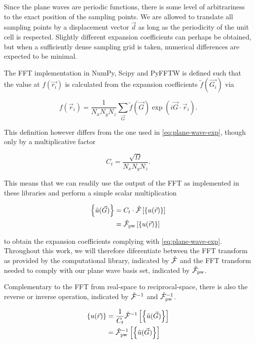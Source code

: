 Since the plane waves are periodic functions, there is some level of arbitrariness to the exact position of the sampling points. We are allowed to translate all sampling points by a displacement vector $\vec{d}$ as long as the periodicity of the unit cell is respected. Slightly different expansion coefficients can perhaps be obtained, but when a sufficiently dense sampling grid is taken, numerical differences are expected to be minimal.

The FFT implementation in NumPy, Scipy and PyFFTW is defined such that the value at $f(\vec{r_{i}})$ is calculated from the expansion coefficients $\tilde{f}(\vec{G_{i}})$ via

\begin{equation}
    f(\vec{r}_{i}) = \frac{1}{N_{x}N_{y}N_{z}} \sum_{\vec{G}} \tilde{f}(\vec{G}) \exp \left(i \vec{G} \cdot \vec{r}_{i} \right).
\end{equation}

This definition however differs from the one used in \cref{eq:plane-wave-exp}, though only by a multiplicative factor

\begin{equation}
    C_{t} = \frac{\sqrt{\Omega}}{N_{x}N_{y}N_{z}}.
    \label{eq:ct}
\end{equation}

This means that we can readily use the output of the FFT as implemented in these libraries and perform a simple scalar multiplication

\begin{align}
    \left\{\tilde{u}(\vec{G})\right\} &= C_{t} \cdot \hat{\mathcal{F}}\left[\left\{ u(\vec{r}) \right\}\right] \\
    &= \hat{\mathcal{F}}_{\text{pw}}\left[\left\{ u(\vec{r}) \right\}\right]
\end{align}

to obtain the expansion coefficients complying with \cref{eq:plane-wave-exp}. Throughout this work, we will therefore diferentiate between the FFT transform as provided by the computational library, indicated by $\hat{\mathcal{F}}$ and the FFT transform needed to comply with our plane wave basis set, indicated by $\hat{\mathcal{F}}_{\text{pw}}$.

Complementary to the FFT from real-space to reciprocal-space, there is also the reverse or inverse operation, indicated by $\hat{\mathcal{F}}^{-1}$ and $\hat{\mathcal{F}}_{\text{pw}}^{-1}$.

\begin{align}
    \left\{ u(\vec{r}) \right\} &= \frac{1}{C_{t}} \hat{\mathcal{F}}^{-1}\left[\left\{\tilde{u}(\vec{G})\right\}\right] \\
    &= \hat{\mathcal{F}}_{\text{pw}}^{-1}\left[\left\{\tilde{u}(\vec{G})\right\}\right]
    \label{eq:fft_pw_inverse}
\end{align}

